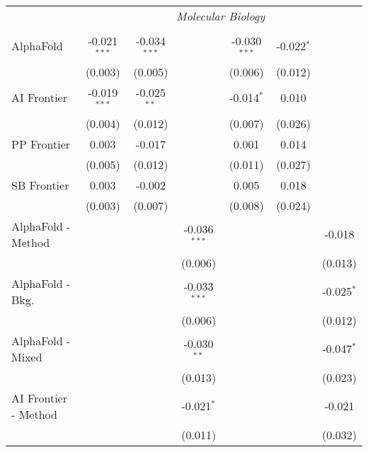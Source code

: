 \begin{tabular}{lcccccc}
 & \multicolumn{6}{c}{\textit{Molecular Biology}} \\ \\
   AlphaFold            & -0.021$^{***}$ & -0.034$^{***}$ &                & -0.030$^{***}$ & -0.022$^{*}$ &   \\   
                        & (0.003)        & (0.005)        &                & (0.006)        & (0.012)      &   \\   
   AI Frontier          & -0.019$^{***}$ & -0.025$^{**}$  &                & -0.014$^{*}$   & 0.010        &   \\   
                        & (0.004)        & (0.012)        &                & (0.007)        & (0.026)      &   \\   
   PP Frontier          & 0.003          & -0.017         &                & 0.001          & 0.014        &   \\   
                        & (0.005)        & (0.012)        &                & (0.011)        & (0.027)      &   \\   
   SB Frontier          & 0.003          & -0.002         &                & 0.005          & 0.018        &   \\   
                        & (0.003)        & (0.007)        &                & (0.008)        & (0.024)      &   \\   
   AlphaFold - Method   &                &                & -0.036$^{***}$ &                &              & -0.018\\   
                        &                &                & (0.006)        &                &              & (0.013)\\   
   AlphaFold - Bkg.     &                &                & -0.033$^{***}$ &                &              & -0.025$^{*}$\\   
                        &                &                & (0.006)        &                &              & (0.012)\\   
   AlphaFold - Mixed    &                &                & -0.030$^{**}$  &                &              & -0.047$^{*}$\\   
                        &                &                & (0.013)        &                &              & (0.023)\\   
   AI Frontier - Method &                &                & -0.021$^{*}$   &                &              & -0.021\\   
                        &                &                & (0.011)        &                &              & (0.032)\\   

\end{tabular}
